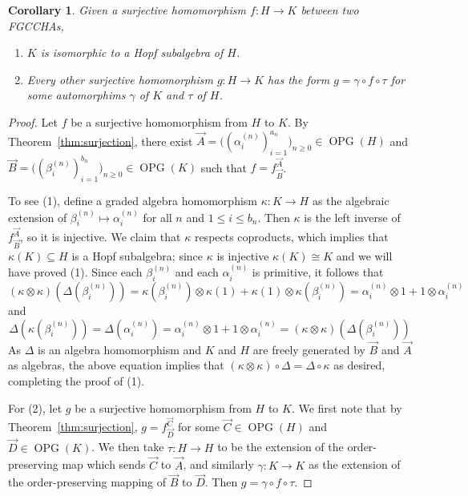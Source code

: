 \documentclass[11pt]{amsart}
\newtheorem{corollary}[theorem]{Corollary}
\theoremstyle{definition}
\numberwithin{equation}{section}
\newcommand{\FGCCHAs}{\textsf{FGCCHA}s\xspace}
\newcommand{\OPG}{\operatorname{OPG}}
\begin{document}
\begin{corollary}
Given a surjective homomorphism $f: H \to K$ between two \FGCCHAs,
\begin{enumerate}
\item $K$ is isomorphic to a Hopf subalgebra of $H$.

\item Every other surjective homomorphism $g: H \to K$ has the form
$g = \gamma \circ f \circ \tau$ for some automorphims $\gamma$ of $K$ and $\tau$ of $H$.

\end{enumerate}
\end{corollary}
\begin{proof}
Let $f$ be a surjective homomorphism from $H$ to $K$.  
By Theorem~\ref{thm:surjection}, there exist $\vec{A}  = \big( ( \alpha_{i}^{(n)})_{i = 1}^{a_{n}} \big)_{n \ge 0} \in \OPG(H)$ and $\vec{B}   = \big( ( \beta_{i}^{(n)})_{i = 1}^{b_{n}} \big)_{n \ge 0}  \in \OPG(K)$ such that $f = f^{\vec{A}}_{\vec{B}}$.  

To see (1), define a graded algebra homomorphism $\kappa: K \to H$ as the algebraic extension of $\beta^{(n)}_{i} \mapsto \alpha^{(n)}_{i}$ for all $n$ and $1\le i \le b_{n}$.  
Then $\kappa$ is the left inverse of $f^{\vec{A}}_{\vec{B}}$, so it is injective.  
We claim that  $\kappa$ respects coproducts, which implies that $\kappa(K) \subseteq H$ is a Hopf subalgebra; since $\kappa$ is injective $\kappa(K) \cong K$ and we will have proved (1).  
Since each $\beta^{(n)}_{i}$ and each $\alpha^{(n)}_{i}$ is primitive, it follows that
\[
(\kappa\otimes\kappa)(\Delta(\beta^{(n)}_{i}))
=
\kappa(\beta^{(n)}_{i}) \otimes \kappa(1) + \kappa(1) \otimes \kappa(\beta^{(n)}_{i})
= 
\alpha^{(n)}_{i} \otimes 1 + 1 \otimes \alpha^{(n)}_{i}
\]
and
\[
\Delta(\kappa(\beta^{(n)}_{i}))
=
\Delta(\alpha^{(n)}_{i})
= 
\alpha^{(n)}_{i} \otimes 1 + 1 \otimes \alpha^{(n)}_{i}
=
(\kappa\otimes\kappa)(\Delta(\beta^{(n)}_{i}))
\]
As $\Delta$ is an algebra homomorphism and $K$ and $H$ are freely generated by $\vec{B}$ and $\vec{A}$ as algebras, the above equation implies that $(\kappa\otimes\kappa) \circ \Delta = \Delta \circ \kappa$ as desired, completing the proof of (1).

For (2),  let $g$ be a surjective homomorphism from $H$ to $K$.  
We first note that by Theorem~\ref{thm:surjection},  $g = f^{\vec{C}}_{\vec{D}}$ for some $\vec{C} \in \OPG(H)$ and $\vec{D} \in \OPG(K)$.  We then take $\tau: H \to H$ to be the extension of the order-preserving map which sends $\vec{C}$ to $\vec{A}$, and similarly $\gamma: K \to K$ as the extension of the order-preserving mapping of $\vec{B}$ to $\vec{D}$.  Then $g = \gamma \circ f \circ \tau$.
\end{proof}
\end{document}
